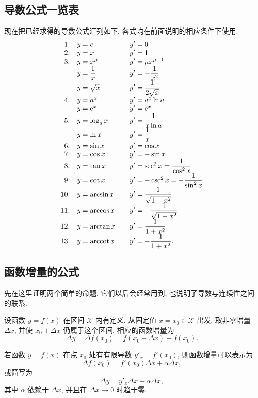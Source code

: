 \subsection{导数公式一览表}\label{subsec:95}
现在把已经求得的导数公式汇列如下, 各式均在前面说明的相应条件下使用.
\label{tab:elementary_derivatives}
$$
\begin{array}{r@{\quad}l@{\qquad}l}
1.&y=c&y'=0\\
2.&y=x&y'=1\\
3.&y=x^\mu&y'=\mu x^{\mu-1}\\
 &y=\dfrac1x&y'=-\dfrac1{x^2}\\
 &y=\sqrt{x}&y'=\dfrac1{2\sqrt{x}}\\
4.&y=a^x&y'=a^x\ln a\\
 &y=\e^x&y'=\e^x\\
5.&y=\log_a x&y'=\dfrac{1}{x\ln a}\\
 &y=\ln x&y'=\dfrac1x\\
6.&y=\sin x&y'=\cos x\\
7.&y=\cos x&y'=-\sin x\\
8.&y=\tan x&y'=\sec^2x=\dfrac1{\cos^2x}\\
9.&y=\cot x&y'=-\csc^2x=-\dfrac1{\sin^2x}\\
10.&y=\arcsin x&y'=\dfrac1{\sqrt{1-x^2}}\\
11.&y=\arccos x&y'=-\dfrac1{\sqrt{1-x^2}}\\
12.&y=\arctan x&y'=\dfrac1{1+x^2}\\
13.&y=\operatorname{arccot}x&y'=-\dfrac1{1+x^2}.
\end{array}
$$

\subsection{函数增量的公式}\label{subsec:96}
先在这里证明两个简单的命题, 它们以后会经常用到, 也说明了导数与连续性之间的联系.

设函数 $y=f(x)$ 在区间 $\mathcal{X}$ 内有定义.
从固定值 $x=x_0\in\mathcal{X}$ 出发, 取非零增量 $\Delta x$,
并使 $x_0+\Delta x$ 仍属于这个区间.
相应的函数增量为
$$
\Delta y=\Delta f(x_0)=f(x_0+\Delta x)-f(x_0).
$$

\myrefparagraph{1\textdegree}\label{prop:function_increment_expansion}
{\kaishu 若函数 $y=f(x)$ 在点 $x_0$ 处有有限导数 $y'_x=f'(x_0)$,
则函数增量可以表示为
\begin{equation}\label{Incremental1}
\Delta f(x_0)=f'(x_0)\Delta x+\alpha\Delta x,
\end{equation}
或简写为
\begin{equation}\tag{\theequation a}\label{Incremental1'}
\Delta y=y'_x\Delta x+\alpha\Delta x,
\end{equation}
其中 $\alpha$ 依赖于 $\Delta x$, 并且在 $\Delta x\to0$ 时趋于零.}


